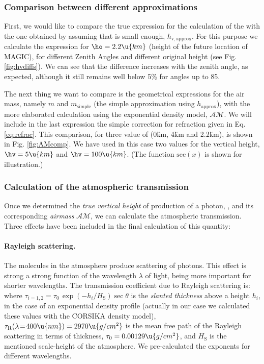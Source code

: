 \subsubsection{Comparison between different approximations}

First, we would like to compare the true expression for the
calculation of the \hv with the one obtained by assuming that \ho is
small enough, $h_{\mathrm{v,approx}}$. For this purpose we calculate
the expression
%
\diffhveq
%
for $\ho=2.2\u{km}$ (height of the future location of MAGIC), for
different Zenith Angles and different original height \hc (see Fig.
\ref{fig:hvdiffs}). We can see that the difference increases with the
zenith angle, as expected, although it still remains well below 5\%
for angles up to 85\deg.

\hvdiffsfig
%
The next thing we want to compare is the geometrical expressions for
the air mass, namely $m$ and $m_{\mathrm{simple}}$ (the simple
approximation using $h_{\mathrm{approx}}$), with the more elaborated
calculation using the exponential density model, $\mathcal{AM}$. We
will include in the last expression the simple correction for
refraction given in Eq.\eqref{eq:refrac}. This comparison, for three
value of \ho (0\u{km}, 4\u{km} and 2.2\u{km}), is shown in
Fig. \ref{fig:AMcomp}. We have used in this case two values for the
vertical height, $\hv=5\u{km}$ and $\hv=100\u{km}$. (The function
$\mathrm{sec}(x)$ is shown for illustration.)

\AMcompfig

\afterpage{\clearpage}

\subsubsection{Calculation of the atmospheric transmission}

Once we determined the \emph{true vertical height} of production of a
photon, \hv, and its corresponding \emph{airmass} $\mathcal{AM}$, we
can calculate the atmospheric transmission. Three effects have been
included in the final calculation of this quantity:

\paragraph{Rayleigh scattering.} The molecules in the atmosphere
produce scattering of photons. This effect is strong a strong function
of the wavelength $\lambda$ of light, being more important for shorter
wavelengths. The transmission coefficient due to Rayleigh scattering
is:
%
\Rayleigheq
%
where $\tau_{i=1,2} = \tau_0 \, \exp(-h_i/H_{\mathrm{S}}) \sec\theta$
is the \emph{slanted thickness} above a height $h_i$, in the case of
an exponential density profile (actually in our case we calculated
these values with the CORSIKA density model),
$\tau_{\mathrm{R}}(\lambda\!=\!400\u{nm}) = 2970\u{g/cm^2}$ is the
mean free path of the Rayleigh scattering in terms of thickness,
$\tau_0 = 0.00129\u{g/cm^2}$, and $H_{\mathrm{S}}$ is the mentioned
scale-height of the atmosphere. We pre-calculated the exponents for
different wavelengths.
  
